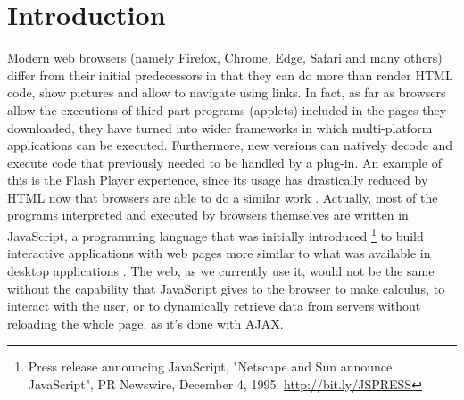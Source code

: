 \documentclass{article}
\begin{document}
\section{Introduction}
Modern web browsers (namely Firefox, Chrome, Edge, Safari and many others) differ from their initial predecessors in that they can do more than render HTML code, show pictures and allow to navigate using links. In fact, as far as browsers allow the executions of third-part programs (applets) included in the
pages they downloaded, they have turned into wider
frameworks in which multi-platform applications can be executed.
Furthermore, new versions can natively decode and execute code that previously needed to be handled by a plug-in. An example of this is the Flash Player experience, since its usage has drastically reduced by HTML now that browsers are able to do a similar work \cite{Winokur11}.
Actually, most of the programs interpreted and executed by browsers themselves are written in JavaScript, a programming language that was initially introduced \footnote{Press release announcing JavaScript, "Netscape and Sun announce JavaScript", PR Newswire, December 4, 1995. \url{http://bit.ly/JSPRESS}} to build interactive applications
with web pages more similar to what was available in desktop
applications \cite{Rauschmayer04}. %
The web, as we currently use it, would not be the same without the
capability that JavaScript gives to the browser to make calculus,
to interact with the user, or to dynamically retrieve data from servers
without reloading the whole page, as it's done with AJAX\cite{powell2008ajax}. %
\end{document}
